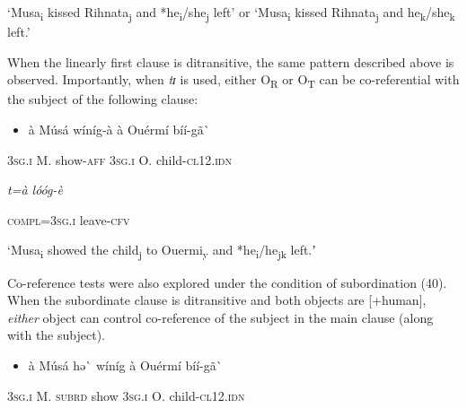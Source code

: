 \documentclass[output=paper]{langsci/langscibook}
\begin{document}
{{{{{\begin{styleTranslation}
‘Musa\textsubscript{i} kissed Rihnata\textsubscript{j} and *he\textsubscript{i}/she\textsubscript{j} left’ or ‘Musa\textsubscript{i} kissed Rihnata\textsubscript{j} and he\textsubscript{k}/she\textsubscript{k} left.’
\end{styleTranslation}

When the linearly first clause is ditransitive, the same pattern described above is observed. Importantly, when \textit{tɪ} is used, either O\textsubscript{R} or O\textsubscript{T }can be co-referential with the subject of the following clause:

\begin{itemize}
\item \begin{styleNumberedEX}
\`{a}    M\'{u}s\'{a}  w\'{i}n\'{i}g-\`{a}  \`{a}    Ou\'{e}rm\'{i}  b\'{i}\'{i}-g\~{a}\`{ }        
\end{styleNumberedEX}\end{itemize}
\begin{styleGloss}
\textsc{3sg.i  }  M.  show-\textsc{aff}  \textsc{3sg.i  }  O.    child-\textsc{cl12.idn}     
\end{styleGloss}

\begin{styleGloss}
\textit{  t=\`{a}      l\'{o}\'{o}g-\`{e}}
\end{styleGloss}

\begin{styleGloss}
\textsc{  compl=3sg.i}        leave-\textsc{cfv}
\end{styleGloss}

\begin{styleTranslation}
‘Musa\textsubscript{i}  showed the child\textsubscript{j} to Ouermi\textsubscript{y} and *he\textsubscript{i}/he\textsubscript{jk} left.ʼ
\end{styleTranslation}

Co-reference tests were also explored under the condition of subordination (40). When the subordinate clause is ditransitive and both objects are [+human], \textit{either} object can control co-reference of the subject in the main clause (along with the subject).

\begin{itemize}
\item \begin{styleNumberedEX}
\label{bkm:Ref424332520}\`{a}    M\'{u}s\'{a}  hə\`{ }    w\'{i}n\'{i}g  \`{a}    Ou\'{e}rm\'{i}      b\'{i}\'{i}-g\~{a}\`{ }    
\end{styleNumberedEX}\end{itemize}
\begin{styleGloss}
\textsc{3sg.i  }  M.  \textsc{subrd}    show  \textsc{3sg.i  }  O.        child-\textsc{cl12.idn}
\end{styleGloss}

}}}}}
\end{document}
